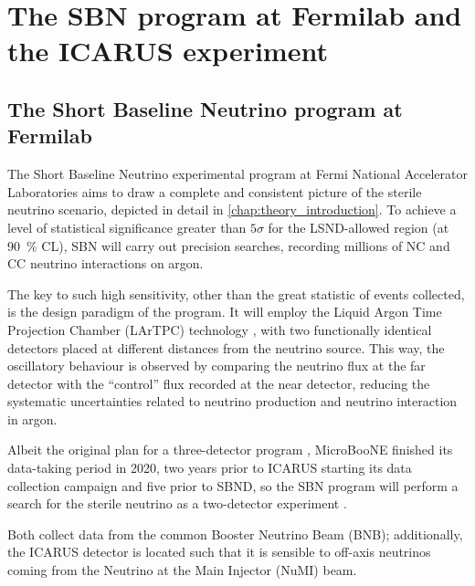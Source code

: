
\chapter{The SBN program at Fermilab and the ICARUS experiment}
\label{chap:icarus_detector}

\section{The Short Baseline Neutrino program at Fermilab}
The Short Baseline Neutrino experimental program at Fermi National Accelerator Laboratories aims to  draw a complete and consistent picture of the sterile neutrino scenario, depicted in detail in \autoref{chap:theory_introduction}. 
To achieve a level of statistical significance greater than $5\sigma$ for the LSND-allowed region (at \SI{90}{\percent} CL), SBN will carry out precision searches, recording millions of NC and CC neutrino interactions on argon. 

The key to such high sensitivity, other than the great statistic of events collected, is the design paradigm of the program. It will employ the Liquid Argon Time Projection Chamber (LArTPC) technology \cite{rubbiaLiquidArgonTime1977}, with two functionally identical detectors placed at different distances from the neutrino source. This way, the oscillatory behaviour is observed by comparing the neutrino flux at the far detector with the ``control'' flux recorded at the near detector, reducing the systematic uncertainties related to neutrino production and neutrino interaction in argon. 

Albeit the original plan for a three-detector program \cite{acciarriProposalThreeDetector2015}, MicroBooNE finished its data-taking period in 2020, two years prior to ICARUS starting its data collection campaign and five prior to SBND, so the SBN program will perform a search for the sterile neutrino as a two-detector experiment \cite{acciarriProposalThreeDetector2015, machadoShortBaselineNeutrinoProgram2019}. 

Both collect data from the common Booster Neutrino Beam (BNB); additionally, the ICARUS detector is located such that it is sensible to off-axis neutrinos coming from the Neutrino at the Main Injector (NuMI) beam. 

